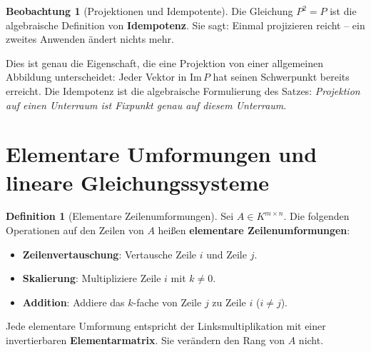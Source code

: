 ﻿\documentclass[a4paper,12pt]{report}
\theoremstyle{definition}
\newtheorem{definition}{Definition}
\newtheorem{beobachtung}{Beobachtung}
\begin{document}
\begin{beobachtung}[Projektionen und Idempotente]
    Die Gleichung $P^2 = P$ ist die algebraische Definition von
    \textbf{Idempotenz}. Sie sagt: Einmal projizieren reicht --
    ein zweites Anwenden ändert nichts mehr.

    Dies ist genau die Eigenschaft, die eine Projektion von einer
    allgemeinen Abbildung unterscheidet: Jeder Vektor in $\mathrm{Im}\, P$
    hat seinen Schwerpunkt bereits erreicht. Die Idempotenz ist die
    algebraische Formulierung des Satzes: \emph{Projektion auf einen
    Unterraum ist Fixpunkt genau auf diesem Unterraum}.
\end{beobachtung}

\section{Elementare Umformungen und lineare Gleichungs\-systeme}

\begin{definition}[Elementare Zeilenumformungen]
    Sei $A \in K^{m \times n}$. Die folgenden Operationen auf den Zeilen
    von $A$ heißen \textbf{elementare Zeilenumformungen}:
    \begin{itemize}
        \item[-] \textbf{Zeilenvertauschung}: Vertausche Zeile $i$ und Zeile $j$.
        \item[-] \textbf{Skalierung}: Multipliziere Zeile $i$ mit $k \neq 0$.
        \item[-] \textbf{Addition}: Addiere das $k$-fache von Zeile $j$ zu Zeile $i$ ($i \neq j$).
    \end{itemize}
    Jede elementare Umformung entspricht der Linksmultiplikation mit einer
    invertierbaren \textbf{Elementarmatrix}. Sie verändern den Rang von $A$
    nicht.
\end{definition}
\end{document}
